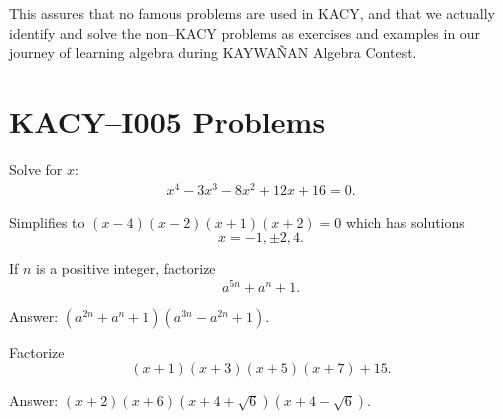 \documentclass[12pt,a4paper]{memoir}
\theoremstyle{definition}
\begin{document}
	This assures that no famous problems are used in KACY, and that we actually identify and solve the non--KACY problems as exercises and examples in our journey of learning algebra during KAYWAÑAN Algebra Contest.
	
	\newpage
	
	\section*{KACY--I005 Problems}
	
	\setcounter{question}{5}
	
	\begin{tcolorbox}
		\begin{question}
		Solve for $x$:
		\begin{align*}
			x^4-3x^3-8x^2+12x+16=0.
		\end{align*}
	\end{question}
	\end{tcolorbox}
	
	\begin{solution}
		Simplifies to $(x - 4) (x - 2) (x + 1) (x + 2) =0$ which has solutions $$x=-1,\pm 2, 4.$$
	\end{solution}
	
	
	
	\setcounter{question}{44}
	
		
	\begin{tcolorbox}
		\SetupExSheets{headings=runin}
		\begin{question}
			If $n$ is a positive integer, factorize $$a^{5n}+a^n+1.$$
		\end{question}
	\end{tcolorbox}
	
	\begin{solution}%
		Answer: $(a^{2n}+a^n+1)(a^{3n}-a^{2n}+1)$.
	\end{solution}
	
	
	
	
	\begin{tcolorbox}
		\begin{question}
			Factorize $$(x+1)(x+3)(x+5)(x+7)+15.$$
		\end{question}
	\end{tcolorbox}
	
	\begin{solution}%
		Answer: $(x+2)(x+6)(x+4+\sqrt{6})(x+4-\sqrt{6})$.
	\end{solution}
	
\end{document}
